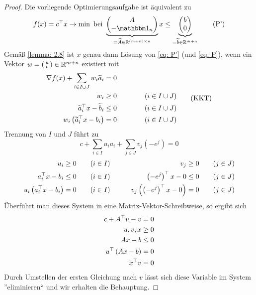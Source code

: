 \begin{proof}
	Die vorliegende Optimierungsaufgabe ist äquivalent zu
	\begin{equation*}
		f(x) = \trans{c} x \to \min \bei \underbrace{\begin{pmatrix} A \\ - \one_n \end{pmatrix}}_{= \schlange{A} \in \R^{(m + n) \times n}} x \le \underbrace{\begin{pmatrix} b \\ 0 \end{pmatrix}}_{= \schlange{b} \in \R^{m+n}}
		\tag{P'}
		\label{eq: P'}
	\end{equation*}
	Gemäß \cref{lemma: 2.8} ist $x$ genau dann Lösung von \eqref{eq: P'} (und \eqref{eq: P}), wenn ein Vektor $w = \left( \begin{smallmatrix} u \\ v \end{smallmatrix} \right) \in \mathbb{R}^{m + n}$ existiert mit 
	\begin{equation*}
		\begin{alignedat}{2}
			\nabla f(x) + \sum_{i \in I \cup J} w_i \widetilde{a}_i &= 0 \\
			w_i &\ge 0 \qquad \qquad &&(i \in I \cup J) \\
			\widetilde{a}_i^{\top} x - \widetilde{b}_i &\le 0 &&(i \in I \cup J) \\
			w_i \left( \widetilde{a}_i^{\top} x - b_i \right) &= 0 &&(i \in I \cup J)
		\end{alignedat}
		\tag{KKT}
	\end{equation*}
	Trennung von $I$ und $J$ führt zu
	\begin{equation*}
		c + \sum_{i \in I} u_i a_i + \sum_{j \in J} v_j (-e^j) = 0
		\tag{KKT}
	\end{equation*}
	\begin{equation*}
		\begin{alignedat}{4}
			u_i &\ge 0 \qquad &&(i \in I) 											& v_j &\ge 0 \qquad &&(j \in J) \\
			a_i^{\top} x - b_i &\le 0 &&(i \in I) 									& \left( -e^j \right)^{\top} x - 0 &\le 0 &&(j \in J) \\
			u_i \left( a_i^{\top} x - b_i \right) &= 0 &&(i \in I) \qquad\quad	& v_j \left( \left( -e^j \right)^{\top} x - 0 \right) &= 0 &&(j \in J)  \\
		\end{alignedat}
	\end{equation*}
	Überführt man dieses System in eine Matrix-Vektor-Schreibweise, so ergibt sich
	\begin{equation*}
		\begin{aligned}
			c + A^{\top} u - v &= 0 \\
			u,v,x &\ge 0 \\
			Ax - b &\le 0 \\
			u^{\top} \left( Ax - b \right) &= 0 \\
			x^{\top} v &= 0
		\end{aligned}
	\end{equation*}
	Durch Umstellen der ersten Gleichung nach $v$ lässt sich diese Variable im System ''eliminieren`` und wir erhalten die Behauptung.
\end{proof}
